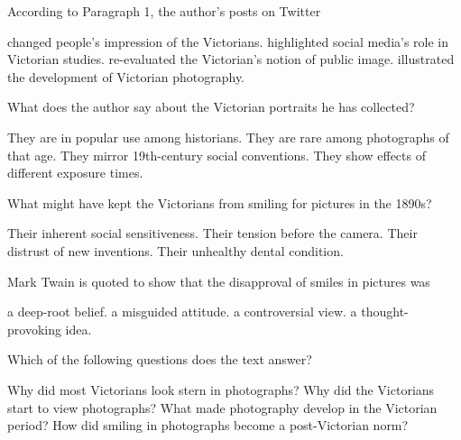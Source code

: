 \item According to Paragraph 1, the author's posts on Twitter
\begin{tasks}
	\task changed people's impression of the Victorians.
	\task highlighted social media's role in Victorian studies.
	\task re-evaluated the Victorian's notion of public image.
	\task illustrated the development of Victorian photography.
\end{tasks}
\item What does the author say about the Victorian portraits he has collected?
\begin{tasks}
	\task They are in popular use among historians.
	\task They are rare among photographs of that age.
	\task They mirror 19th-century social conventions.
	\task They show effects of different exposure times.
\end{tasks}
\item What might have kept the Victorians from smiling for pictures in the 1890s?
\begin{tasks}
	\task Their inherent social sensitiveness.
	\task Their tension before the camera.
	\task Their distrust of new inventions.
	\task Their unhealthy dental condition.
\end{tasks}
\item Mark Twain is quoted to show that the disapproval of smiles in pictures was
\begin{tasks}
	\task a deep-root belief.
	\task a misguided attitude.
	\task a controversial view.
	\task a thought-provoking idea.
\end{tasks}
\item Which of the following questions does the text answer?
\begin{tasks}
	\task Why did most Victorians look stern in photographs?
	\task Why did the Victorians start to view photographs?
	\task What made photography develop in the Victorian period?
	\task How did smiling in photographs become a post-Victorian norm?
\end{tasks}